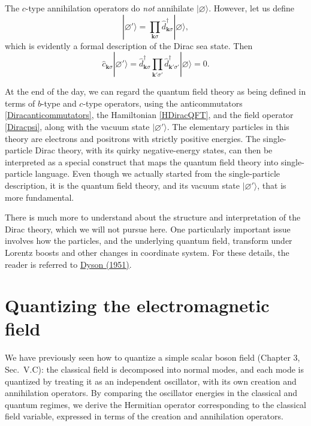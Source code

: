 \documentclass[pra,12pt]{revtex4}
\begin{document}
The $c$-type annihilation operators do \textit{not} annihilate
$|\varnothing\rangle$.  However, let us define
\begin{equation}
  |\varnothing'\rangle = \prod_{\mathbf{k}\sigma} \hat{d}_{\mathbf{k}\sigma}^\dagger
  |\varnothing\rangle,
\end{equation}
which is evidently a formal description of the Dirac sea state.  Then
\begin{equation}
  \hat{c}_{\mathbf{k}\sigma} |\varnothing'\rangle = 
  \hat{d}^\dagger_{\mathbf{k}\sigma} \prod_{\mathbf{k}'\sigma'}
  \hat{d}_{\mathbf{k}'\sigma'}^\dagger |\varnothing\rangle = 0.
\end{equation}

At the end of the day, we can regard the quantum field theory as being
defined in terms of $b$-type and $c$-type operators, using the
anticommutators \eqref{Diracanticommutators}, the Hamiltonian
\eqref{HDiracQFT}, and the field operator \eqref{Diracpsi}, along with
the vacuum state $|\varnothing'\rangle$.  The elementary particles in
this theory are electrons and positrons with strictly positive
energies.  The single-particle Dirac theory, with its quirky
negative-energy states, can then be interpreted as a special construct
that maps the quantum field theory into single-particle language.
Even though we actually started from the single-particle description,
it is the quantum field theory, and its vacuum state
$|\varnothing'\rangle$, that is more fundamental.

There is much more to understand about the structure and
interpretation of the Dirac theory, which we will not pursue here.
One particularly important issue involves how the particles, and the
underlying quantum field, transform under Lorentz boosts and other
changes in coordinate system.  For these details, the reader is
referred to \hyperref[cite:dyson]{Dyson (1951)}.

\section{Quantizing the electromagnetic field}
\label{sec:em_quantization}

We have previously seen how to quantize a simple scalar boson field
(Chapter 3, Sec.~V.C): the classical field is decomposed into normal
modes, and each mode is quantized by treating it as an independent
oscillator, with its own creation and annihilation operators.  By
comparing the oscillator energies in the classical and quantum
regimes, we derive the Hermitian operator corresponding to the
classical field variable, expressed in terms of the creation and
annihilation operators.
\end{document}
